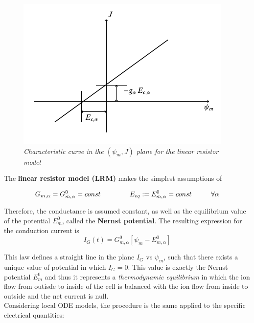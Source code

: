 \documentclass[a4paper]{article}
\begin{document}
\begin{figure}[H]
	\begin{center}
		\includegraphics[scale=0.77]{LRM.png} 
	\end{center} 
	\caption{\textit{Characteristic curve in the $(\psi_m,J)$ plane for the linear resistor model}}
	
\end{figure}

The \textbf{linear resistor model (LRM)} makes the simplest assumptions of

\begin{equation}
G_{m,\alpha} = G_{m,\alpha}^0 = const \hspace{1.5 cm} E_{eq} := E_{m,\alpha}^0 = const \hspace{1cm} \forall \alpha
\end{equation}

Therefore, the conductance is assumed constant, as well as the equilibrium value of the potential $E_m^0 $, called the \textbf{Nernst potential}.
The resulting expression for the conduction current is
\begin{equation}
I_G(t) = G_{m,\alpha}^0 [\psi_m -  E_{m,\alpha}^0]
\end{equation}

This law defines a straight line in the plane $I_G$ vs $\psi_m$, such that there exists a unique value of potential in which $I_G=0$. This value is exactly the Nernst potential $E_m^0$ and thus it represents a \textit{thermodynamic equilibrium} in which the ion flow from outisde to inside of the cell is balanced with the ion flow from inside to outside and the net current is null.\\
Considering local ODE models, the procedure is the same applied to the specific electrical quantities:
\end{document}
